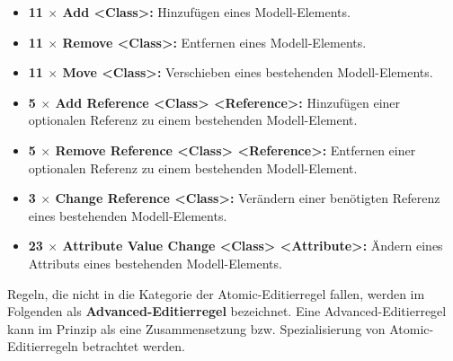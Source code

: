 \begin{itemize}
  \item \textbf{11 $\times$ Add <Class>:} Hinzufügen eines Modell-Elements.
  \item \textbf{11 $\times$ Remove <Class>:} Entfernen eines Modell-Elements.
  \item \textbf{11 $\times$ Move <Class>:} Verschieben eines bestehenden Modell-Elements.
  \item \textbf{5 $\times$ Add Reference <Class> <Reference>:} Hinzufügen einer optionalen Referenz zu
  einem bestehenden Modell-Element.
  \item \textbf{5 $\times$ Remove Reference <Class> <Reference>:} Entfernen einer optionalen Referenz zu
  einem bestehenden Modell-Element.
  \item \textbf{3 $\times$ Change Reference <Class>:} Verändern einer benötigten Referenz eines
  bestehenden Modell-Elements.
  \item \textbf{23 $\times$ Attribute Value Change <Class> <Attribute>:} Ändern eines Attributs eines
  bestehenden Modell-Elements.
\end{itemize}
Regeln, die nicht in die Kategorie der Atomic-Editierregel fallen, werden im Folgenden als
\textbf{Advanced-Editierregel} bezeichnet. Eine Advanced-Editierregel kann im Prinzip als eine
Zusammensetzung bzw. Spezialisierung von Atomic-Editierregeln betrachtet werden.


% 

